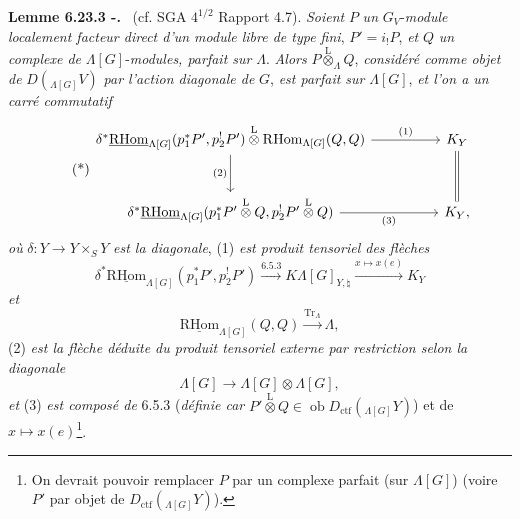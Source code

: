 \documentclass[11pt]{article}
\newenvironment{statement}[1]{\par\medskip\noindent\textbf{#1.}\ }{\par\medskip}
\newcommand{\R}{\mathrm{R}}\newcommand{\RHomCore}{\mathrm{RHom}}
\newcommand{\ob}{\operatorname{ob}}
\providecommand{\RHom}{\RHomCore}
\providecommand{\uRHom}{\underline{\RHom}}
\providecommand{\Tr}{\operatorname{Tr}}
\providecommand{\Tr}{\operatorname{Tr}}
\providecommand{\lten}{\overset{\mathrm L}{\otimes}}
\providecommand{\Tr}{\operatorname{Tr}}
\providecommand{\RHom}{\RHomCore}
\providecommand{\ob}{\operatorname{ob}}
\providecommand{\lten}{\overset{\mathrm L}{\otimes}}
\providecommand{\RHom}{\R\mathcal{H}om}
\providecommand{\lten}{\overset{\mathrm L}{\otimes}}
\providecommand{\R}{\mathrm R}
\providecommand{\Tr}{\operatorname{Tr}}
\providecommand{\lten}{\overset{\mathrm L}{\otimes}}
\providecommand{\lten}{\overset{\mathrm L}{\otimes}}
\providecommand{\lten}{\overset{\mathrm L}{\otimes}}
\providecommand{\RHom}{\RHomCore}
\providecommand{\Tr}{\operatorname{Tr}}
\providecommand{\lten}{\overset{\mathrm L}{\otimes}}
\begin{document}
\begin{statement}{Lemme 6.23.3 -}
(cf. SGA $4^{1/2}$ Rapport 4.7). \emph{Soient} $P$ \emph{un} $G_V$-\emph{module localement facteur direct d'un module libre de type fini}, $P'=i_!P$, \emph{et} $Q$ \emph{un complexe de} $\Lambda[G]$-\emph{modules, parfait sur} $\Lambda$. \emph{Alors} $P\lten_{\Lambda}Q$, \emph{considéré comme objet de} $D({}_{\Lambda[G]}V)$ \emph{par l'action diagonale de} $G$, \emph{est parfait sur} $\Lambda[G]$, \emph{et l'on a un carré commutatif}
\begin{equation}
\tag{*}
\begin{tikzcd}[column sep=huge,row sep=large]
\delta^*\uRHom_{\Lambda[G]}(p_1^*P',p_2^!P')\lten
\mathrm{R}\mathrm{Hom}_{\Lambda[G]}(Q,Q) \arrow[r,"(1)"] \arrow[d,"(2)"']
& K_Y \arrow[d,equal]\\
\delta^*\uRHom_{\Lambda[G]}(p_1^*P'\lten Q,p_2^!P'\lten Q) \arrow[r,"(3)"']
& K_Y ,
\end{tikzcd}
\end{equation}
\emph{où} $\delta:Y\to Y\times_SY$ \emph{est la diagonale}, (1) \emph{est produit tensoriel des flèches}
\[
\delta^*\uRHom_{\Lambda[G]}(p_1^*P',p_2^!P')\xrightarrow{6.5.3}
K\Lambda[G]_{Y,\natural}\xrightarrow{x\mapsto x(e)}K_Y
\]
\emph{et}
\[
\uRHom_{\Lambda[G]}(Q,Q)\xrightarrow{\Tr_{\Lambda}}\Lambda,
\]
(2) \emph{est la flèche déduite du produit tensoriel externe par restriction selon la diagonale}
\[
\Lambda[G]\to\Lambda[G]\otimes\Lambda[G],
\]
\emph{et} (3) \emph{est composé de} 6.5.3 (\emph{définie car} $P'\lten Q\in\ob D_{\mathrm{ctf}}({}_{\Lambda[G]}Y)$) et de $x\mapsto x(e)$\footnote{On devrait pouvoir remplacer $P$ par un complexe parfait (sur $\Lambda[G]$) (voire $P'$ par objet de $D_{\mathrm{ctf}}({}_{\Lambda[G]}Y)$).}.
\end{statement}
\end{document}
